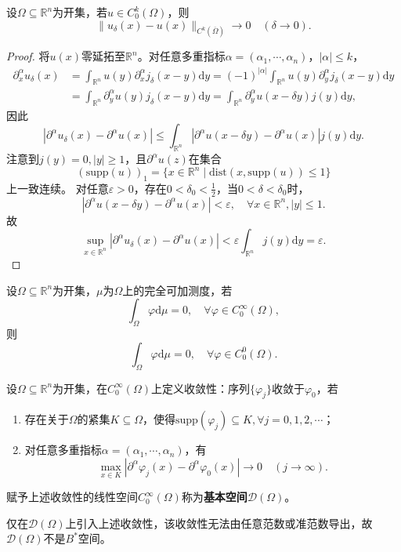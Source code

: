 \documentclass[../../main.tex]{subfiles}%
\begin{document}
\begin{theorem}\label{theorem:磨光逼近定理}
设$\Omega\subseteq\mathbb{R}^n$为开集，若$u\in C_0^k(\Omega)$，则
$$\|u_\delta(x)-u(x)\|_{C^k(\overline{\Omega})}\to0\quad(\delta\to0).$$
\end{theorem}
\begin{proof}
将$u(x)$零延拓至$\mathbb{R}^n$。对任意多重指标$\alpha=(\alpha_1,\cdots,\alpha_n)$，$|\alpha|\leqslant k$，
\begin{align*}
\partial_x^\alpha u_\delta(x)&=\int_{\mathbb{R}^n}u(y)\partial_x^\alpha j_\delta(x-y)\mathrm{d}y
=(-1)^{|\alpha|}\int_{\mathbb{R}^n}u(y)\partial_y^\alpha j_\delta(x-y)\mathrm{d}y\\
&=\int_{\mathbb{R}^n}\partial_y^\alpha u(y)j_\delta(x-y)\mathrm{d}y=\int_{\mathbb{R}^n}\partial_y^\alpha u(x-\delta y)j(y)\mathrm{d}y,
\end{align*}
因此
$$|\partial^\alpha u_\delta(x)-\partial^\alpha u(x)|\leqslant\int_{\mathbb{R}^n}|\partial^\alpha u(x-\delta y)-\partial^\alpha u(x)|j(y)\mathrm{d}y.$$
注意到$j(y)=0,|y|\geqslant1$，且$\partial^\alpha u(z)$在集合
$$(\mathrm{supp}(u))_1=\{x\in\mathbb{R}^n\mid\mathrm{dist}(x,\mathrm{supp}(u))\leqslant1\}$$
上一致连续。
对任意$\varepsilon>0$，存在$0<\delta_0<\frac{1}{2}$，当$0<\delta<\delta_0$时，
$$|\partial^\alpha u(x-\delta y)-\partial^\alpha u(x)|<\varepsilon,\quad\forall x\in\mathbb{R}^n,|y|\leqslant1.$$
故
$$\sup\limits_{x\in\mathbb{R}^n}|\partial^\alpha u_\delta(x)-\partial^\alpha u(x)|<\varepsilon\int_{\mathbb{R}^n}j(y)\mathrm{d}y=\varepsilon.
$$\end{proof}

\begin{corollary}
设$\Omega\subseteq\mathbb{R}^n$为开集，$\mu$为$\Omega$上的完全可加测度，若
$$\int_{\Omega}\varphi\mathrm{d}\mu=0,\quad\forall\varphi\in C_0^\infty(\Omega),$$
则
$$\int_{\Omega}\varphi\mathrm{d}\mu=0,\quad\forall\varphi\in C_0^0(\Omega).$$
\end{corollary}

\begin{definition}
设$\Omega\subseteq\mathbb{R}^n$为开集，在$C_0^\infty(\Omega)$上定义收敛性：序列$\{\varphi_j\}$收敛于$\varphi_0$，若
\begin{enumerate}[(1)]
\item 存在关于$\Omega$的紧集$K\subseteq\Omega$，使得$\mathrm{supp}(\varphi_j)\subseteq K,\forall j=0,1,2,\cdots$；
\item 对任意多重指标$\alpha=(\alpha_1,\cdots,\alpha_n)$，有
$$\max\limits_{x\in K}|\partial^\alpha\varphi_j(x)-\partial^\alpha\varphi_0(x)|\to0\quad(j\to\infty).$$
\end{enumerate}
赋予上述收敛性的线性空间$C_0^\infty(\Omega)$称为\textbf{基本空间}$\mathscr{D}(\Omega)$。
\end{definition}
\begin{remark}
仅在$\mathscr{D}(\Omega)$上引入上述收敛性，该收敛性无法由任意范数或准范数导出，故$\mathscr{D}(\Omega)$不是$B^*$空间。
\end{remark}
\end{document}
